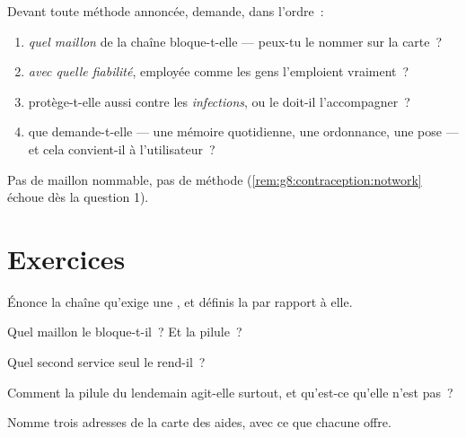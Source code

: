 \begin{method}\label{met:g8:contraception:evaluate}
Devant toute méthode annoncée, demande, dans l'ordre~:
\begin{enumerate}
  \item \emph{quel maillon} de la chaîne bloque-t-elle --- peux-tu
        le nommer sur la carte~?
  \item \emph{avec quelle fiabilité}, employée comme les gens
        l'emploient vraiment~?
  \item protège-t-elle aussi contre les \emph{infections}, ou le
         doit-il l'accompagner~?
  \item que demande-t-elle --- une mémoire quotidienne, une
        ordonnance, une pose --- et cela convient-il à
        l'utilisateur~?
\end{enumerate}
Pas de maillon nommable, pas de méthode
(\cref{rem:g8:contraception:notwork} échoue dès la question
1).
\end{method}

\section{Exercices}

\begin{exercise}[$\star$]\label{exo:g8:contraception:1}
Énonce la chaîne qu'exige une , et définis la 
par rapport à elle.
\end{exercise}

\begin{exercise}[$\star$]\label{exo:g8:contraception:2}
Quel maillon le  bloque-t-il~? Et la pilule~?
\end{exercise}

\begin{exercise}[$\star$]\label{exo:g8:contraception:3}
Quel second service seul le  rend-il~?
\end{exercise}

\begin{exercise}[$\star$]\label{exo:g8:contraception:4}
Comment la pilule du lendemain agit-elle surtout, et qu'est-ce
qu'elle n'est pas~?
\end{exercise}

\begin{exercise}[$\star$]\label{exo:g8:contraception:5}
Nomme trois adresses de la carte des aides, avec ce que chacune
offre.
\end{exercise}

